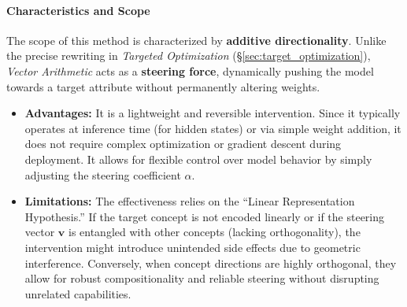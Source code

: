 \documentclass[11pt,letterpaper]{mystyle}
\begin{document}
\paragraph{Characteristics and Scope}
The scope of this method is characterized by \textbf{additive directionality}. Unlike the precise rewriting in \textit{Targeted Optimization} (\S\ref{sec:target_optimization}), \textit{Vector Arithmetic} acts as a \textbf{steering force}, dynamically pushing the model towards a target attribute without permanently altering weights.
\begin{itemize}[leftmargin=*]
    \item \textbf{Advantages:} It is a lightweight and reversible intervention. Since it typically operates at inference time (for hidden states) or via simple weight addition, it does not require complex optimization or gradient descent during deployment. It allows for flexible control over model behavior by simply adjusting the steering coefficient $\alpha$.
    \item \textbf{Limitations:} The effectiveness relies on the ``Linear Representation Hypothesis.'' If the target concept is not encoded linearly or if the steering vector $\mathbf{v}$ is entangled with other concepts (lacking orthogonality), the intervention might introduce unintended side effects due to geometric interference. Conversely, when concept directions are highly orthogonal, they allow for robust compositionality and reliable steering without disrupting unrelated capabilities.
\end{itemize}



\end{document}
